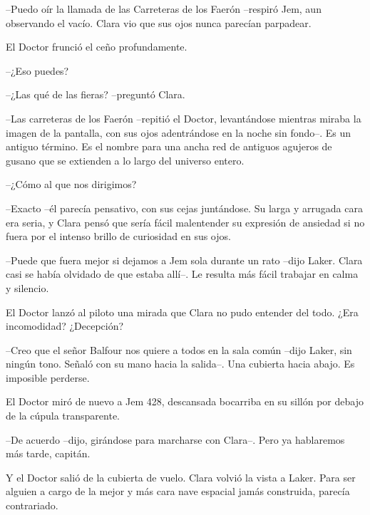 {--Puedo oír la llamada de las Carreteras de los Faerón --respiró Jem,
 aun observando el vacío. Clara vio que sus ojos nunca parecían
parpadear.}

{El Doctor frunció el ceño profundamente.}

{--¿Eso puedes?}

{--¿Las qué de las fieras? --preguntó Clara.}

{--Las carreteras de los Faerón --repitió el Doctor, levantándose
 mientras miraba la imagen de la pantalla, con sus ojos adentrándose en
 la noche sin fondo--. Es un antiguo término. Es el nombre para una ancha
 red de antiguos agujeros de gusano que se extienden a lo largo del
universo entero.}

{--¿Cómo al que nos dirigimos?}

{--Exacto --él parecía pensativo, con sus cejas juntándose. Su larga y
 arrugada cara era seria, y Clara pensó que sería fácil malentender su
 expresión de ansiedad si no fuera por el intenso brillo de curiosidad en
sus ojos.}

{--Puede que fuera mejor si dejamos a Jem sola durante un rato --dijo
 Laker. Clara casi se había olvidado de que estaba allí--. Le resulta más
fácil trabajar en calma y silencio.}

{El Doctor lanzó al piloto una mirada que Clara no pudo entender del
todo. ¿Era incomodidad? ¿Decepción?}

{--Creo que el señor Balfour nos quiere a todos en la sala común --dijo
 Laker, sin ningún tono. Señaló con su mano hacia la salida--. Una
cubierta hacia abajo. Es imposible perderse.}

{El Doctor miró de nuevo a Jem 428, descansada bocarriba en su sillón por
debajo de la cúpula transparente.}

{--De acuerdo --dijo, girándose para marcharse con Clara--. Pero ya
hablaremos más tarde, capitán.}

{Y el Doctor salió de la cubierta de vuelo. Clara volvió la vista a
 Laker. Para ser alguien a cargo de la mejor y más cara nave espacial
jamás construida, parecía contrariado.}
